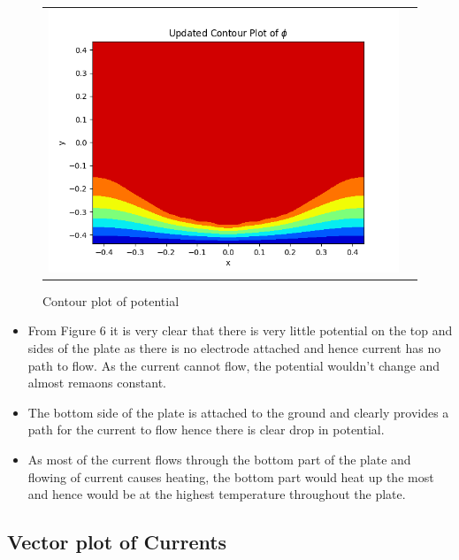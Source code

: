 \documentclass[11pt, a4paper]{article}
\begin{document}
 		\begin{figure}[H]
                    \centering
                    \setlength\tabcolsep{2pt}
                    \begin{tabular}{cc}
                       \includegraphics[scale=0.9]{Fig6.png}
                    \end{tabular}
                    \caption{Contour plot of potential} 
                \end{figure}
 		
           \begin{itemize}
           \item
           From Figure 6 it is very clear that there is very little potential on the top and sides of the plate as there is no electrode attached and hence current has no path to flow. As the current cannot flow, the potential wouldn't change and almost remaons constant.
           \item
           The bottom side of the plate is attached to the ground and clearly provides a path for the current to flow hence there is clear drop in potential.
           \item
           As most of the current flows through the bottom part of the plate and flowing of current causes heating, the bottom part would heat up the most and hence would be at the highest temperature throughout the plate.
           
           \end{itemize}
           
     \subsection{Vector plot of Currents}
        
\end{document}
